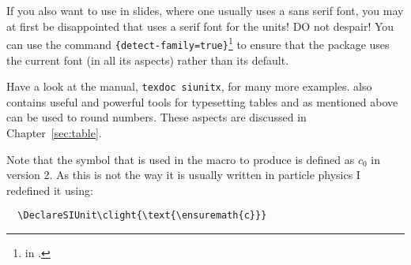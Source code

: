 If you also want to use  in slides, where one usually
uses a sans serif font, you may at first be disappointed that
 uses a serif font for the units! DO not despair!
You can use the command
\texttt{\{detect-family=true\}}\footnote{
  in .} to ensure that the package uses the current font
(in all its aspects) rather than its default.

Have a look at the manual, \texttt{texdoc siunitx}, for many more
examples.  also contains useful and powerful tools
for typesetting tables and as mentioned above can be used to round
numbers. These aspects are discussed in Chapter~\ref{sec:table}.

Note that the  symbol that is used in the macro
 to produce \si{\MeVovercsq} is defined as $c_{0}$ in
 version 2. As this is not the way it is usually
written in particle physics I redefined it using:
\begin{verbatim}
  \DeclareSIUnit\clight{\text{\ensuremath{c}}}
\end{verbatim}

